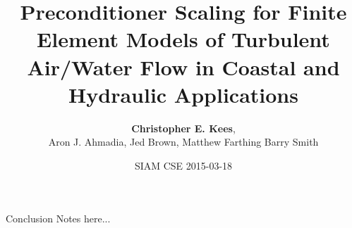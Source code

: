 \documentclass{beamer}
\title{Preconditioner Scaling for Finite Element Models of Turbulent Air/Water Flow in Coastal and Hydraulic Applications}
\author{{\bf Christopher E. Kees}\inst{1},\\
Aron J. Ahmadia\inst{1}, Jed Brown\inst{2}, Matthew Farthing \inst{1} Barry Smith\inst{2}}
\institute
{
  \inst{2}{Coastal and Hydraulics Laboratory, US Army Engineer
    Research and Development Center} \\
  \inst{3}{Mathematics and Computer Science Division, Argonne National Laboratory} \\
}
\date{SIAM CSE 2015-03-18}
\begin{document}
\lstset{language=C}
\normalem

\begin{frame}
  \titlepage
\end{frame}







\begin{frame}{Conclusion}
  Notes here...
\end{frame}
\end{document}
